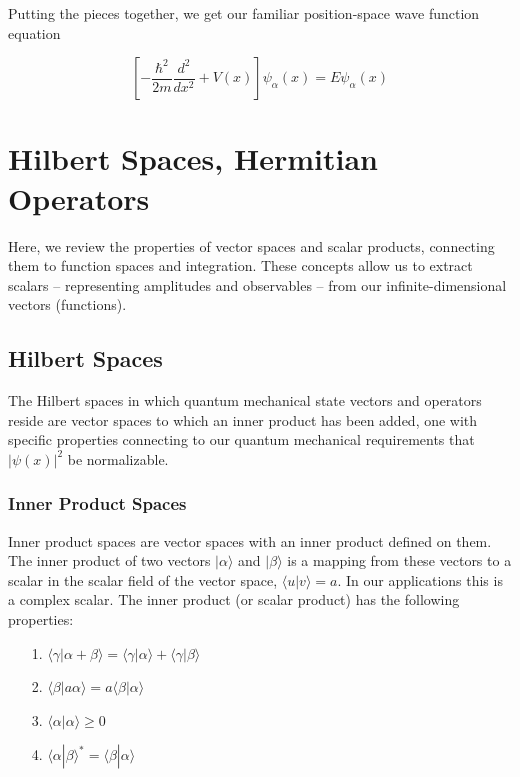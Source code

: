Putting the pieces together, we get our familiar position-space wave function
equation

\[
  \left[ -\frac{\hbar^2}{2m} \frac{d^2 }{d x^2}  + V(x) \right] \psi_\alpha(x)
  = E\psi_\alpha(x)
\] \vspace{3px}


\section{Hilbert Spaces, Hermitian Operators}


Here, we review the properties of vector spaces and scalar products, connecting
them to function spaces and integration. These concepts allow us to extract
scalars -- representing amplitudes and observables -- from our
infinite-dimensional vectors (functions).

\subsection{Hilbert Spaces} 

The Hilbert spaces in which quantum mechanical state vectors and operators
reside are vector spaces to which an inner product has been added, one with
specific properties connecting to our quantum mechanical requirements that
$|\psi(x)|^2$ be normalizable. 

\subsubsection{Inner Product Spaces} 

Inner product spaces are vector spaces with an inner product defined on them.
The inner product of two vectors $| \alpha \rangle$ and $| \beta \rangle$ is
a mapping from these vectors to a scalar in the scalar field of the vector
space, $\langle u|v \rangle = a$. In our applications this is a complex scalar.
The inner product (or scalar product) has the following properties: 

\begin{itemize}
  \item[1.] $\langle \gamma | \alpha + \beta \rangle = \langle \gamma | \alpha
    \rangle + \langle \gamma | \beta \rangle$ 
  \item[2.]  $\langle \beta | a \alpha \rangle = a \langle \beta | \alpha
    \rangle$
  \item[3.] $\langle \alpha | \alpha \rangle \geq 0$ 
  \item[4.] $\langle \alpha | \beta \rangle^* = \langle \beta | \alpha \rangle$
\end{itemize}

